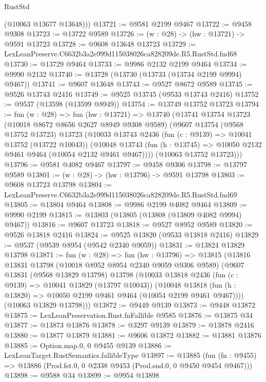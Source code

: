 \begin{lexlean}{RustStd}
\begin{coremodule}
        (@10063 @13677 @13648)))
@13721 := @9581 @2199 @9467
@13722 := @9458 @9308
@13723 := @13722 @9589
@13726 := (w : @28) -> (hw : @13721) -> @9591 @13723
@13728 := @9608 @13648 @13723
@13729 := LexLeanPreserve.C6632b3a2e999d115038026ca828209de.R5.RustStd.fnd68
@13730 := @13729 @9464
@13733 := @9986 @2132 @2199 @9464
@13734 := @9990 @2132
@13740 := @13728 (@13730 (@13733 (@13734 @2199 @9994) @9467))
@13741 := @9607 @13648
@13743 := @9527 @8672 @9589
@13745 := @9526 @13743 @2416
@13749 := @9525 @13745 (@9533 @13743 @2416)
@13752 := @9537 (@13598 (@13599 @8949))
@13754 := @13749 @13752 @13723
@13794 := fun (w : @28) =>
  fun (hw : @13721) =>
  @13740
    (@13741
      @13754
      @13723
      (@10018 @8672 @8656 @2627 @8949 @9308 @9589)
      (@9607
        @13754
        (@9568 @13752 @13723)
        @13723
        (@10033
          @13743
          @2436
          (fun (c : @9139) => @10041 @13752 (@13722 @10043))
          (@10048 @13743 (fun (h : @13745) => @10050 @2132 @9461 @9464 (@10054 @2132 @9461 @9467))))
        (@10063 @13752 @13723)))
@13796 := @9581 @4082 @9467
@13797 := @9458 @9306
@13798 := @13797 @9589
@13801 := (w : @28) -> (hw : @13796) -> @9591 @13798
@13803 := @9608 @13723 @13798
@13804 := LexLeanPreserve.C6632b3a2e999d115038026ca828209de.R5.RustStd.fnd69
@13805 := @13804 @9464
@13808 := @9986 @2199 @4082 @9464
@13809 := @9990 @2199
@13815 := @13803 (@13805 (@13808 (@13809 @4082 @9994) @9467))
@13816 := @9607 @13723
@13818 := @9527 @8952 @9589
@13820 := @9526 @13818 @2416
@13824 := @9525 @13820 (@9533 @13818 @2416)
@13829 := @9537 (@9539 @8954 (@9542 @2340 @9059))
@13831 := @13824 @13829 @13798
@13871 := fun (w : @28) =>
  fun (hw : @13796) =>
  @13815
    (@13816
      @13831
      @13798
      (@10018 @8952 @8954 @2340 @9059 @9306 @9589)
      (@9607
        @13831
        (@9568 @13829 @13798)
        @13798
        (@10033
          @13818
          @2436
          (fun (c : @9139) => @10041 @13829 (@13797 @10043))
          (@10048 @13818 (fun (h : @13820) => @10050 @2199 @9461 @9464 (@10054 @2199 @9461 @9467))))
        (@10063 @13829 @13798)))
@13872 := @9449 @9139
@13873 := @9448 @13872
@13875 := LexLeanPreservation.Rust.fnFallible @9585
@13876 := @13875 @34
@13877 := @13873 @13876
@13878 := @3297 @9139
@13879 := @13878 @2416
@13880 := @13877 @13879
@13881 := @9606 @13872
@13882 := @13881 @13876
@13885 := Option.map.{0, 0} @9455 @9139
@13886 := LexLeanTarget.RustSemantics.fallibleType
@13897 := @13885
    (fun (fn : @9455) => @13886 (Prod.fst.{0, 0} @2338 @9453 (Prod.snd.{0, 0} @9450 @9454 @9467)))
@13898 := @9588 @34
@13899 := @9954 @13898

\end{coremodule}
\end{lexlean}
